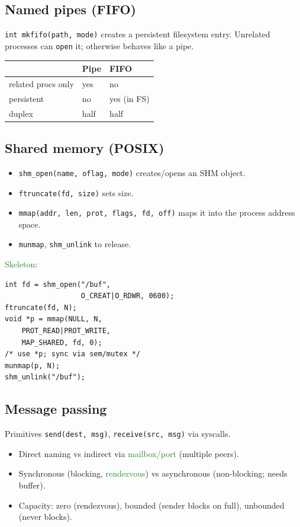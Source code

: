 \subsection{Named pipes (FIFO)}
\texttt{int \textcolor{Bittersweet}{mkfifo}(path, mode)} creates a persistent filesystem entry. Unrelated processes can \texttt{open} it; otherwise behaves like a pipe.

\begin{tabular}{lll}
\toprule
 & \textbf{Pipe} & \textbf{FIFO} \\
\midrule
related procs only & yes & no \\
persistent & no & yes (in FS) \\
duplex & half & half \\
\bottomrule
\end{tabular}

\subsection{Shared memory (POSIX)}
\begin{itemize}
  \item \texttt{\textcolor{Bittersweet}{shm\_open}(name, oflag, mode)} creates/opens an SHM object.
  \item \texttt{\textcolor{Bittersweet}{ftruncate}(fd, size)} sets size.
  \item \texttt{\textcolor{Bittersweet}{mmap}(addr, len, prot, flags, fd, off)} maps it into the process address space.
  \item \texttt{\textcolor{Bittersweet}{munmap}}, \texttt{\textcolor{Bittersweet}{shm\_unlink}} to release.
\end{itemize}
\textcolor{ForestGreen}{Skeleton}:
\begin{verbatim}
int fd = shm_open("/buf",
                  O_CREAT|O_RDWR, 0600);
ftruncate(fd, N);
void *p = mmap(NULL, N,
    PROT_READ|PROT_WRITE,
    MAP_SHARED, fd, 0);
/* use *p; sync via sem/mutex */
munmap(p, N);
shm_unlink("/buf");
\end{verbatim}

\subsection{Message passing}
Primitives \texttt{send(dest, msg)}, \texttt{receive(src, msg)} via syscalls.
\begin{itemize}
  \item \textcolor{Bittersweet}{Direct} naming vs \textcolor{Bittersweet}{indirect} via \textcolor{ForestGreen}{mailbox/port} (multiple peers).
  \item \textcolor{Bittersweet}{Synchronous} (blocking, \textcolor{ForestGreen}{rendezvous}) vs \textcolor{Bittersweet}{asynchronous} (non-blocking; needs buffer).
  \item \textcolor{Bittersweet}{Capacity}: zero (rendezvous), bounded (sender blocks on full), unbounded (never blocks).
\end{itemize}

